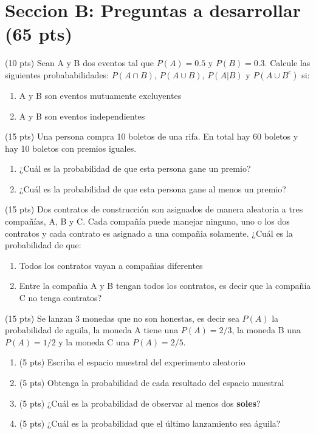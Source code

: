 \documentclass[addpoints]{exam}
\theoremstyle{mytheor}
\begin{document}
  \section*{Seccion B: Preguntas a desarrollar (65 pts)}
  
  \begin{questions} 

  \question (10 pts)
  Sean A y B dos eventos tal que $P(A) = 0.5$ y $P(B) = 0.3$. Calcule las siguientes probababilidades: $P(A \cap B)$, $P(A \cup B)$, $P(A|B)$ y $P(A \cup B^c)$ si:
  \begin{enumerate}
  \item A y B son eventos mutuamente excluyentes
  \item A y B son eventos independientes
  \end{enumerate}
  
  \question  (15 pts)
  Una persona compra 10 boletos de una rifa. En total hay 60 boletos y hay 10 boletos con premios iguales.
  \begin{enumerate}
  \item ¿Cuál es la probabilidad de que esta persona gane un premio?
  \item ¿Cuál es la probabilidad de que esta persona gane al menos un premio?
  \end{enumerate}
  
  \question (15 pts) Dos contratos de construcción son asignados de manera aleatoria a tres compañías, A, B y C. Cada compañía puede manejar ninguno, uno o los dos contratos y cada contrato es asignado a una compañia solamente. ¿Cuál es la probabilidad de que:
  \begin{enumerate}
  \item Todos los contratos vayan a compañias diferentes
  \item Entre la compañia A y B tengan todos los contratos, es decir que la compañia C no tenga contratos?
  \end{enumerate}


  \question (15 pts) Se lanzan 3 monedas que no son honestas, es decir sea $P(A)$ la probabilidad de aguila, la moneda A tiene una $P(A) = 2/3$, la moneda B una $P(A) = 1/2$ y la moneda C una $P(A) = 2/5$.
  
  \begin{enumerate}
  \item (5 pts) Escriba el espacio muestral del experimento aleatorio
  \item (5 pts) Obtenga la probabilidad de cada resultado del espacio muestral
  \item (5 pts) ¿Cuál es la probabilidad de observar al menos dos \textbf{soles}?
  \item (5 pts) ¿Cuál es la probabilidad que el último lanzamiento sea águila?
  \end{enumerate}
  

\end{questions}
\end{document}

